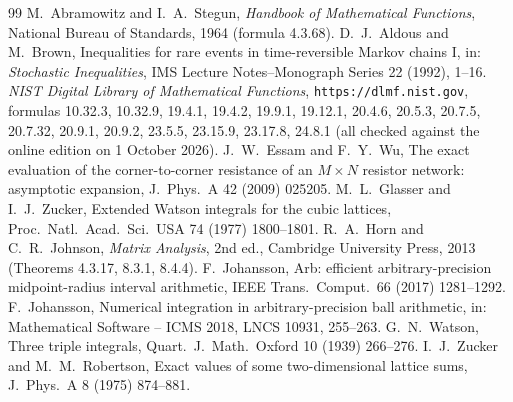 \documentclass[11pt,a4paper]{article}
\theoremstyle{plain}
\theoremstyle{definition}
\numberwithin{equation}{section}
\begin{document}
\begin{thebibliography}{99}\small
{} M.~Abramowitz and I.~A.~Stegun, \emph{Handbook of Mathematical Functions}, National Bureau of Standards, 1964 (formula 4.3.68).
 D.~J.~Aldous and M.~Brown, Inequalities for rare events in time-reversible Markov chains I, in: \emph{Stochastic Inequalities}, IMS Lecture Notes--Monograph Series 22 (1992), 1--16.
 \emph{NIST Digital Library of Mathematical Functions}, \texttt{https://dlmf.nist.gov}, formulas 10.32.3, 10.32.9, 19.4.1, 19.4.2, 19.9.1, 19.12.1, 20.4.6, 20.5.3, 20.7.5, 20.7.32, 20.9.1, 20.9.2, 23.5.5, 23.15.9, 23.17.8, 24.8.1 (all checked against the online edition on 1 October 2026).
 J.~W.~Essam and F.~Y.~Wu, The exact evaluation of the corner-to-corner resistance of an $M\times N$ resistor network: asymptotic expansion, J.~Phys.~A 42 (2009) 025205.
 M.~L.~Glasser and I.~J.~Zucker, Extended Watson integrals for the cubic lattices, Proc.\ Natl.\ Acad.\ Sci.\ USA 74 (1977) 1800--1801.
 R.~A.~Horn and C.~R.~Johnson, \emph{Matrix Analysis}, 2nd ed., Cambridge University Press, 2013 (Theorems 4.3.17, 8.3.1, 8.4.4).
 F.~Johansson, Arb: efficient arbitrary-precision midpoint-radius interval arithmetic, IEEE Trans.\ Comput.\ 66 (2017) 1281--1292.
 F.~Johansson, Numerical integration in arbitrary-precision ball arithmetic, in: Mathematical Software -- ICMS 2018, LNCS 10931, 255--263.
 G.~N.~Watson, Three triple integrals, Quart.\ J.\ Math.\ Oxford 10 (1939) 266--276.
 I.~J.~Zucker and M.~M.~Robertson, Exact values of some two-dimensional lattice sums, J.~Phys.~A 8 (1975) 874--881.
\end{thebibliography}
\end{document}
